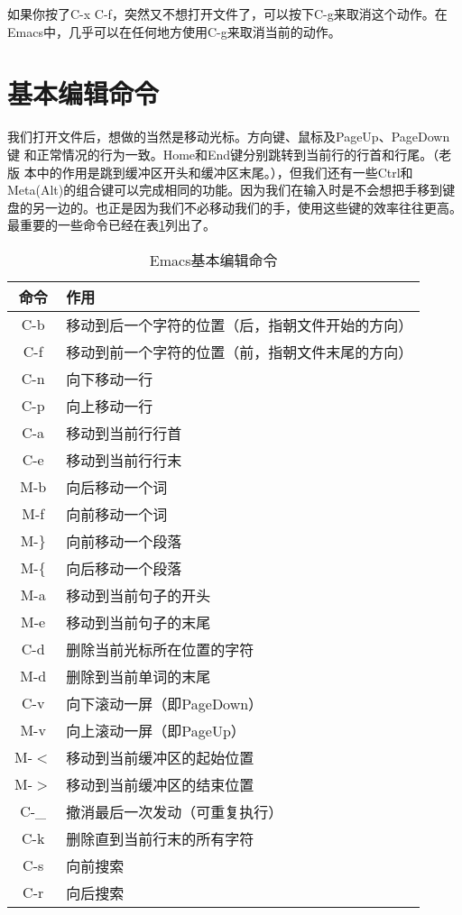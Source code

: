 如果你按了C-x C-f，突然又不想打开文件了，可以按下C-g来取消这个动作。在
Emacs中，几乎可以在任何地方使用C-g来取消当前的动作。

\section{基本编辑命令}
\label{sec:emacs:basicEditing}
我们打开文件后，想做的当然是移动光标。方向键、鼠标及PageUp、PageDown键
和正常情况的行为一致。Home和End键分别跳转到当前行的行首和行尾。（老版
本中的作用是跳到缓冲区开头和缓冲区末尾。），但我们还有一些Ctrl和
Meta(Alt)的组合键可以完成相同的功能。因为我们在输入时是不会想把手移到键
盘的另一边的。也正是因为我们不必移动我们的手，使用这些键的效率往往更高。
最重要的一些命令已经在表\ref{tab:basic-emacs-editing}列出了。

\begin{table}[htpb]
  \centering
  \begin{tabular}{c|l}
    \hline\hline
    命令 & 作用 \\ \hline
    C-b & 移动到后一个字符的位置（后，指朝文件开始的方向）\\
    C-f & 移动到前一个字符的位置（前，指朝文件末尾的方向） \\
    C-n & 向下移动一行 \\
    C-p & 向上移动一行 \\
    C-a & 移动到当前行行首\\
    C-e & 移动到当前行行末 \\
    M-b & 向后移动一个词\\
    M-f & 向前移动一个词\\
    M-\} & 向前移动一个段落\\
    M-\{ & 向后移动一个段落 \\
    M-a & 移动到当前句子的开头\\
    M-e & 移动到当前句子的末尾\\
    C-d & 删除当前光标所在位置的字符\\
    M-d & 删除到当前单词的末尾\\
    C-v & 向下滚动一屏（即PageDown）\\
    M-v & 向上滚动一屏（即PageUp）\\
    M-$<$ & 移动到当前缓冲区的起始位置 \\
    M-$>$ & 移动到当前缓冲区的结束位置\\
    C-\_ & 撤消最后一次发动（可重复执行）\\
    C-k & 删除直到当前行末的所有字符\\
    C-s & 向前搜索\\
    C-r & 向后搜索\\
    \hline\hline
  \end{tabular}
  \caption{Emacs基本编辑命令}
  \label{tab:basic-emacs-editing}
\end{table}

